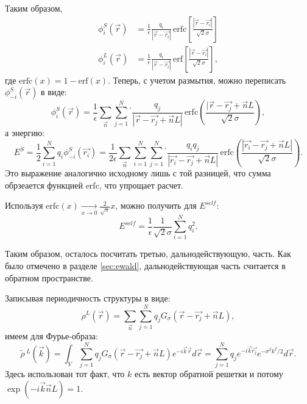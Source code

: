 Таким образом,
\begin{equation}
\label{eq:jel:phi_S_solution}
\begin{aligned}
    \phi_i^S (\vec{r}) &= \frac{1}{\epsilon} \frac{q_i}{|\vec{r} -\vec{r_i}|}\, \mathrm{erfc} \left[ \frac{|\vec{r} - \vec{r_i}|}{\sqrt{2} \sigma} \right] \\
    \phi_i^L (\vec{r}) &= \frac{1}{\epsilon} \frac{q_i}{|\vec{r} -\vec{r_i}|}\, \mathrm{erf} \left[ \frac{|\vec{r} - \vec{r_i}|}{\sqrt{2} \sigma} \right],
\end{aligned}
\end{equation}
где $\mathrm{erfc} (x) = 1 - \mathrm{erf} (x)$. Теперь, с учетом размытия, можно переписать $\phi^S_{-i} (\vec{r})$ в виде:
\begin{equation*}
    \phi_i^S (\vec{r}) = \frac{1}{\epsilon} \sum_\vec{n} \sum_{j=1}^N {}^\prime \frac{q_j}{| \vec{r} - \vec{r_j} + \vec{n}L |}\, \mathrm{erfc} \left( \frac{|\vec{r} - \vec{r_j} + \vec{n}L}{\sqrt{2} \sigma} \right),
\end{equation*}
а энергию:
\begin{equation*}
    E^S = \frac{1}{2} \sum_{i=1}^N q_i \phi_{-i}^S (\vec{r_i})
    = \frac{1}{2\epsilon} \sum_\vec{n} \sum_{i=1}^N \sum_{j=1}^N {}^\prime \frac{q_i q_j}{|\vec{r_i} - \vec{r_j} + \vec{n}L|}\, \mathrm{erfc} \left( \frac{|\vec{r_i} - \vec{r_j} + \vec{n}L|}{\sqrt{2}\sigma} \right).
\end{equation*}
Это выражение аналогично исходному лишь с той разницей, что сумма обрзеается функцией $\mathrm{erfc}$, что упрощает расчет.

Используя $\mathrm{erfc} (x) \xrightarrow[x \rightarrow 0]{} \frac{2}{\sqrt{\pi}} x$, можно получить для $E^{self}$:
\begin{equation}
    \label{eq:jel:E_self_final}
    E^{self} = \frac{1}{\epsilon} \frac{1}{\sqrt{2} \sigma} \sum_{i=1}^N q_i^2.
\end{equation}

Таким образом, осталось посчитать третью, дальнодействующую, часть.
Как было отмечено в разделе \ref{sec:ewald}, дальнодействующая часть считается в обратном пространстве.

Записывая периодичность структуры в виде:
\begin{equation*}
    \rho^L (\vec{r}) = \sum_\vec{n} \sum_{j=1}^N q_j G_\sigma (\vec{r} - \vec{r_j} + \vec{n}L),
\end{equation*}
имеем для Фурье-образа:
\begin{equation*}
    \tilde{\rho}\,^L (\vec{k}) = \int_V \sum_{j=1}^N q_j G_\sigma(\vec{r} - \vec{r_j} + \vec{n}L) e^{-i\vec{k}\vec{r}} d \vec{r}
    = \sum_{j=1}^N q_j e^{-i \vec{k} \vec{r_j}} e^{-\sigma^2 k^2 / 2} d\vec{r}.
\end{equation*}
Здесь использован тот факт, что $k$ есть вектор обратной решетки и потому $\exp(-i \vec{k} \vec{n} L) = 1$.

